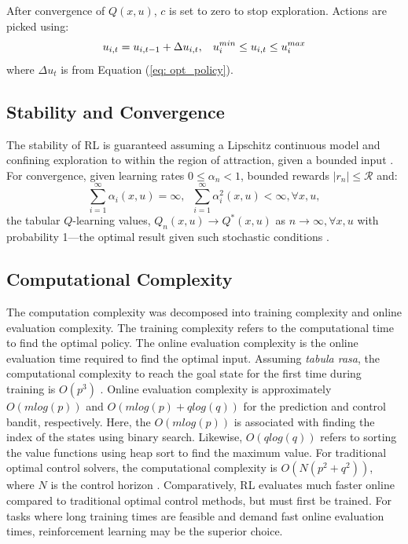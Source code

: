 After convergence of $Q(x, u)$, $c$ is set to zero to stop exploration. Actions are picked using:
\begin{equation}
u_{i, t} = u_{i, t - 1} + \Delta u_{i, t}, \hspace*{0.3cm} u_{i}^{min} \leq u_{i, t} \leq u_{i}^{max}
\label{eq:velocity_controller}
\end{equation}
where $\Delta u_t$ is from Equation (\ref{eq: opt_policy}).

\subsection{Stability and Convergence}
The stability of RL is guaranteed assuming a Lipschitz continuous model and confining exploration to within the region of attraction, given a bounded input \cite{stability_rl_ref21}. For convergence, given learning rates $0 \leq \alpha_n < 1$, bounded rewards $|r_n| \leq \mathcal{R}$ and:
\begin{equation}
    \sum\limits^{\infty}_{i = 1}\alpha_i(x, u) = \infty, \; \;  \sum\limits^{\infty}_{i = 1}\alpha_i^2(x, u) < \infty, \forall x, u,
\end{equation}
the tabular $Q$-learning values, $Q_n(x, u) \rightarrow Q^*(x, u)$ as $n \rightarrow \infty, \forall x, u$ with probability 1---the optimal result given such stochastic conditions \cite{convergence_rl_ref20}.  

\subsection{Computational Complexity}
The computation complexity was decomposed into training complexity and online evaluation complexity.  The training complexity refers to the computational time to find the optimal policy.  The online evaluation complexity is the online evaluation time required to find the optimal input.  Assuming \textit{tabula rasa}, the computational complexity to reach the goal state for the first time during training is $O(p^3)$ \cite{complexity_rl_ref19}. Online evaluation complexity is approximately $O(mlog(p))$ and $O(mlog(p) + qlog(q))$ for the prediction and control bandit, respectively. Here, the $O(mlog(p))$ is associated with finding the index of the states using binary search.  Likewise, $O(qlog(q))$ refers to sorting the value functions using heap sort to find the maximum value. For traditional optimal control solvers, the computational complexity is $O(N(p^2 + q^2))$, where $N$ is the control horizon \cite{mpc_comp_time}. Comparatively, RL evaluates much faster online compared to traditional optimal control methods, but must first be trained.  For tasks where long training times are feasible and demand fast online evaluation times, reinforcement learning may be the superior choice.

